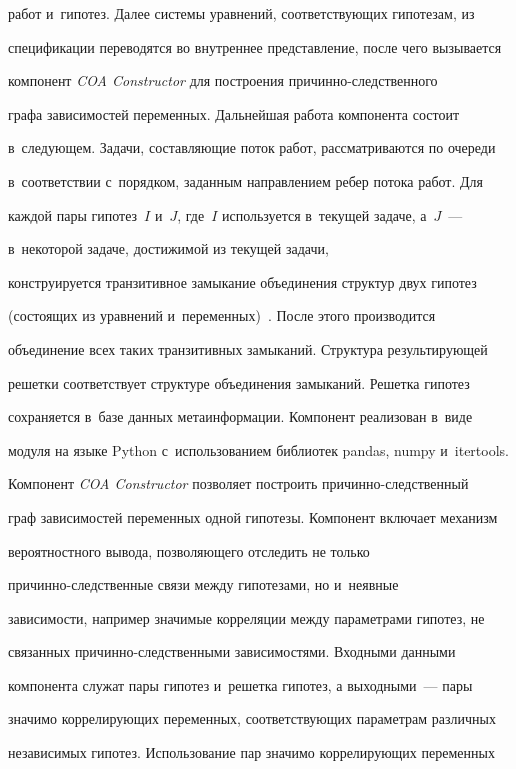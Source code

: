 работ и~гипотез. Далее системы уравнений, соответствующих гипотезам, из 


спецификации переводятся во внутреннее представление, после чего вызывается 


компонент \textit{COA Constructor} для построения при\-чин\-но-след\-ст\-вен\-но\-го 


графа зависимостей переменных. Дальнейшая работа компонента состоит 


в~следующем. Задачи, составляющие поток работ, рассматриваются по очереди 


в~соответствии с~порядком, заданным направлением ребер потока работ. Для 


каждой пары гипотез~$I$ и~$J$, где~$I$ используется в~текущей задаче, а~$J$~--- 


в~некоторой задаче, достижимой из текущей задачи, 


конструируется транзитивное замыкание объединения структур двух гипотез 


(состоящих из уравнений и~переменных)~\cite{4-kt}. После этого производится 


объединение всех таких транзитивных замыканий. Структура результирующей 


решетки соответствует структуре объединения замыканий. Решетка гипотез 


сохраняется в~базе данных метаинформации. Компонент реализован в~виде 


модуля на языке Python с~использованием библиотек pandas, numpy и~itertools.





Компонент \textit{COA Constructor} позволяет построить причинно-следственный 


граф зависимостей переменных одной гипотезы. Компонент включает механизм 


вероятностного вывода, позволяющего отследить не только  


при\-чин\-но-след\-ст\-вен\-ные связи между гипотезами, но и~неявные 


зависимости, например значимые корреляции между параметрами гипотез, не 


связанных причинно-следственными зависимостями. Входными данными 


компонента служат пары гипотез и~решетка гипотез, а выходными~--- пары 


значимо коррелирующих переменных, соответствующих параметрам различных 


независимых гипотез. Использование пар значимо коррелирующих переменных 


